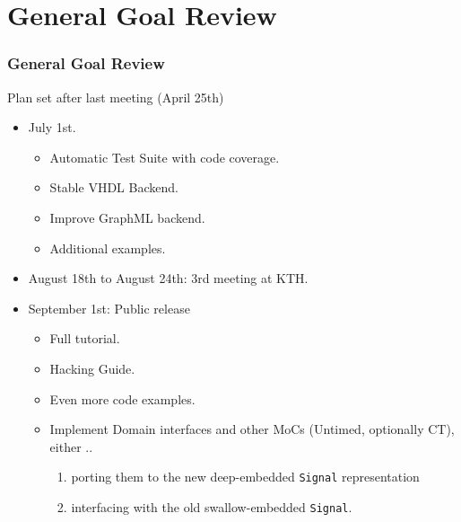 \documentclass{beamer}
\begin{document}
\section{General Goal Review}
\begin{frame}
  \frametitle{General Goal Review}
  Plan set after last meeting (April 25th)
  \begin{itemize}
  \item<1-> July 1st.
    \begin{itemize}
    \item Automatic Test Suite with code
      coverage. 
    \item Stable VHDL Backend. 
    \item Improve GraphML backend. 
    \item Additional examples. 
    \end{itemize}
  \item<3-> August 18th to August 24th: 3rd meeting at KTH.
    
  \item<4-> September 1st: Public release
    \begin{itemize}
      \item Full tutorial. 
      \item Hacking Guide. 
      \item Even more code examples. 
      \item Implement Domain interfaces and other MoCs (Untimed,
        optionally CT), either
        .. 
        \begin{enumerate}
        \item porting them to the new deep-embedded \texttt{Signal} representation
        \item interfacing with the old swallow-embedded \texttt{Signal}.
        \end{enumerate}
    \end{itemize}
  \end{itemize}
\end{frame}
\end{document}
